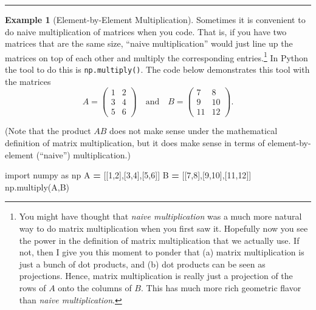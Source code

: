 \documentclass[
]{book}
\newenvironment{Shaded}{\begin{snugshade}}{\end{snugshade}}
\newcommand{\DecValTok}[1]{\textcolor[rgb]{0.00,0.00,0.81}{#1}}
\newcommand{\ImportTok}[1]{#1}
\newcommand{\NormalTok}[1]{#1}
\newcommand{\OperatorTok}[1]{\textcolor[rgb]{0.81,0.36,0.00}{\textbf{#1}}}
\theoremstyle{definition}
\theoremstyle{definition}
\newtheorem{example}{Example}[chapter]
\theoremstyle{definition}
\theoremstyle{remark}
\begin{document}
\begin{center}\rule{0.5\linewidth}{0.5pt}\end{center}

\begin{example}[Element-by-Element Multiplication]
\protect\hypertarget{exm:unnamed-chunk-309}{}{\label{exm:unnamed-chunk-309} {} }Sometimes it is convenient to do naive multiplication of matrices when you code. That is, if you have two matrices that are the same size, ``naive multiplication'' would just line up the matrices on top of each other and multiply the corresponding entries.\footnote{You might have thought that \emph{naive multiplication} was a much more natural way to do matrix multiplication when you first saw it. Hopefully now you see the power in the definition of matrix multiplication that we actually use. If not, then I give you this moment to ponder that (a) matrix multiplication is just a bunch of dot products, and (b) dot products can be seen as projections. Hence, matrix multiplication is really just a projection of the rows of \(A\) onto the columns of \(B\). This has much more rich geometric flavor than \emph{naive multiplication}.} In Python the tool to do this is \texttt{np.multiply()}. The code below demonstrates this tool with the matrices
\[ A = \begin{pmatrix} 1 & 2 \\ 3 & 4 \\ 5 & 6 \end{pmatrix} \quad \text{and} \quad B = \begin{pmatrix} 7 & 8 \\ 9 & 10 \\ 11 & 12 \end{pmatrix}. \]

(Note that the product \(AB\) does not make sense under the mathematical definition of matrix multiplication, but it does make sense in terms of element-by-element (``naive'') multiplication.)
\end{example}

\begin{Shaded}
\begin{Highlighting}[]
\ImportTok{import}\NormalTok{ numpy }\ImportTok{as}\NormalTok{ np}
\NormalTok{A }\OperatorTok{=}\NormalTok{ [[}\DecValTok{1}\NormalTok{,}\DecValTok{2}\NormalTok{],[}\DecValTok{3}\NormalTok{,}\DecValTok{4}\NormalTok{],[}\DecValTok{5}\NormalTok{,}\DecValTok{6}\NormalTok{]]}
\NormalTok{B }\OperatorTok{=}\NormalTok{ [[}\DecValTok{7}\NormalTok{,}\DecValTok{8}\NormalTok{],[}\DecValTok{9}\NormalTok{,}\DecValTok{10}\NormalTok{],[}\DecValTok{11}\NormalTok{,}\DecValTok{12}\NormalTok{]]}
\NormalTok{np.multiply(A,B)}
\end{Highlighting}
\end{Shaded}
\end{document}
